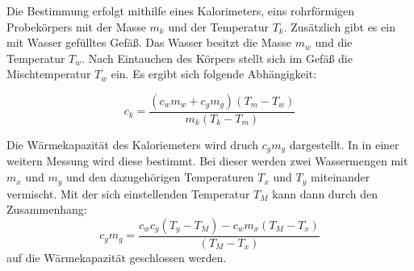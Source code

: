 Die Bestimmung erfolgt mithilfe eines Kalorimeters,
eins rohrförmigen Probekörpers mit der Masse $m_k$ und der Temperatur 
$T_k$. Zusätzlich gibt es ein mit Wasser gefülltes Gefäß.
Das Wasser besitzt die Masse $m_w$ und die Temperatur $T_w$.
Nach Eintauchen des Körpers stellt sich im Gefäß die 
Mischtemperatur $T_w$ ein. 
Es ergibt sich folgende Abhängigkeit:

\begin{equation*}
\label{eq:zusammenhang_ck}
c_k=\frac{\left(c_wm_w+c_gm_g\right)\left(T_m-T_w\right)}{m_k\left(T_k-T_m\right)}
\end{equation*}

Die Wärmekapazität des Kaloriemeters wird druch $c_gm_g$ dargestellt.
In in einer weitern Messung wird diese bestimmt.
Bei dieser werden zwei Wassermengen mit $m_x$ und $m_y$ und den 
dazugehörigen Temperaturen $T_x$ und $T_y$ miteinander vermischt.
Mit der sich einstellenden Temperatur $T_M$ kann dann
durch den Zusammenhang:
\begin{equation}
\label{eq:zusammenhang_cgmg}
c_gm_g=\frac{c_wc_y\left(T_y-T_M\right)-c_wm_x\left(T_M-T_x\right)}{\left(T_M-T_x\right)}
\end{equation}
auf die Wärmekapazität geschlossen werden.

